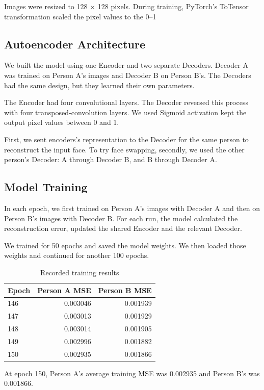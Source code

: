 Images were resized to 128 $\times$ 128 pixels. During training, PyTorch's ToTensor transformation scaled the pixel values to the 0--1

\subsection{Autoencoder Architecture}
We built the model using one Encoder and two separate Decoders. Decoder A was trained on Person A's images and Decoder B on Person B's. The Decoders had the same design, but they learned their own parameters.

The Encoder had four convolutional layers. The Decoder reversed this process with four transposed-convolution layers. We used Sigmoid activation kept the output pixel values between 0 and 1.

First, we sent encoders’s representation to the Decoder for the same person to reconstruct the input face. To try face swapping, secondly, we used the other person's Decoder: A through Decoder B, and B through Decoder A.

\subsection{Model Training}
In each epoch, we first trained on Person A's images with Decoder A and then on Person B's images with Decoder B. For each run, the model calculated the reconstruction error, updated the shared Encoder and the relevant Decoder.

We trained for 50 epochs and saved the model weights. We then loaded those weights and continued for another 100 epochs.

\begin{table}[tb]
  \centering
  \footnotesize
  \begin{tabular}{@{}l r r@{}}
    \toprule
    Epoch & Person A MSE & Person B MSE \\
    \midrule
    146 & 0.003046 & 0.001939 \\
    147 & 0.003013 & 0.001929 \\
    148 & 0.003014 & 0.001905 \\
    149 & 0.002996 & 0.001882 \\
    150 & 0.002935 & 0.001866 \\
    \bottomrule
  \end{tabular}
  \caption{Recorded training results}
\end{table}

At epoch 150, Person A's average training MSE was 0.002935 and Person B's was 0.001866.

